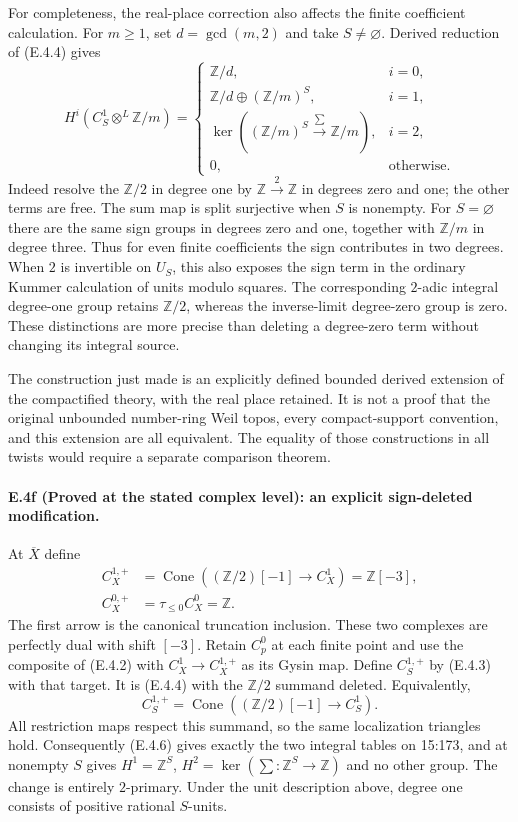 For completeness, the real-place correction also affects the finite
coefficient calculation. For $m\geq1$, set $d=\gcd(m,2)$ and take
$S\ne\varnothing$. Derived reduction of (E.4.4) gives
\[
 H^i(C_S^1\otimes^{L}\mathbb Z/m)=
 \begin{cases}
 \mathbb Z/d,&i=0,\\
 \mathbb Z/d\oplus(\mathbb Z/m)^S,&i=1,\\
 \ker((\mathbb Z/m)^S\xrightarrow{\sum}\mathbb Z/m),&i=2,\\
 0,&\text{otherwise}.
 \end{cases}
 \tag{E.4.5}
\]
Indeed resolve the $\mathbb Z/2$ in degree one by
$\mathbb Z\xrightarrow{2}\mathbb Z$ in degrees zero and one;
the other terms are free. The sum map is split surjective when $S$
is nonempty. For $S=\varnothing$ there are the same sign groups in
degrees zero and one, together with $\mathbb Z/m$ in degree three.
Thus for even finite coefficients the sign contributes in two degrees.
When $2$ is invertible on $U_S$, this also exposes the sign term in
the ordinary Kummer calculation of units modulo squares.
The corresponding $2$-adic integral degree-one group retains
$\mathbb Z/2$, whereas the inverse-limit degree-zero group is zero.
These distinctions are more precise than deleting a degree-zero term
without changing its integral source.

The construction just made is an explicitly defined bounded derived
extension of the compactified theory, with the real place retained.
It is not a proof that the original unbounded number-ring Weil topos,
every compact-support convention, and this extension are all equivalent.
The equality of those constructions in all twists would require a
separate comparison theorem.

\paragraph{E.4f (Proved at the stated complex level): an explicit sign-deleted modification.}
At $\overline X$ define
\[
 \begin{aligned}
 C_X^{1,+}&=\operatorname{Cone}((\mathbb Z/2)[-1]\to C_X^1)
                 =\mathbb Z[-3],\\
 C_X^{0,+}&=\tau_{\leq0}C_X^0=\mathbb Z .
 \end{aligned}
 \tag{E.4.6}
\]
The first arrow is the canonical truncation inclusion.
These two complexes are perfectly dual with shift $[-3]$.
Retain $C_p^0$ at each finite point and use the composite of (E.4.2)
with $C_X^1\to C_X^{1,+}$ as its Gysin map. Define
$C_S^{1,+}$ by (E.4.3) with that target. It is (E.4.4) with
the $\mathbb Z/2$ summand deleted. Equivalently,
\[
 C_S^{1,+}=\operatorname{Cone}((\mathbb Z/2)[-1]\to C_S^1).
\]
All restriction maps respect this summand, so the same localization
triangles hold. Consequently (E.4.6) gives exactly the two integral
tables on 15:173, and at nonempty $S$ gives
$H^1=\mathbb Z^S$, $H^2=\ker(\sum:\mathbb Z^S\to\mathbb Z)$
and no other group. The change is entirely $2$-primary.
Under the unit description above, degree one consists of positive
rational $S$-units.

